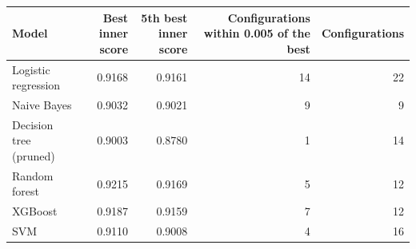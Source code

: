 \begin{tabular}{lrrrr}
\toprule
\textbf{Model} & \textbf{Best inner score} & \textbf{5th best inner score} & \textbf{Configurations within 0.005 of the best} & \textbf{Configurations} \\
\midrule
Logistic regression & 0.9168 & 0.9161 & 14 & 22 \\
Naive Bayes & 0.9032 & 0.9021 & 9 & 9 \\
Decision tree (pruned) & 0.9003 & 0.8780 & 1 & 14 \\
Random forest & 0.9215 & 0.9169 & 5 & 12 \\
XGBoost & 0.9187 & 0.9159 & 7 & 12 \\
SVM & 0.9110 & 0.9008 & 4 & 16 \\
\bottomrule
\end{tabular}
